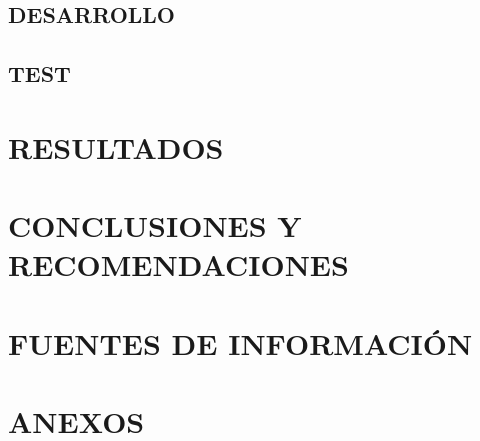 \documentclass[a4paper,12pt]{report}
\begin{document}
			\section {DESARROLLO}
				
				
			\section {TEST }
				
			
		
		\chapter {RESULTADOS}
		
		\chapter {CONCLUSIONES Y RECOMENDACIONES}
		
		\chapter {FUENTES DE INFORMACIÓN}
		
		\chapter {ANEXOS}
\end{document}
